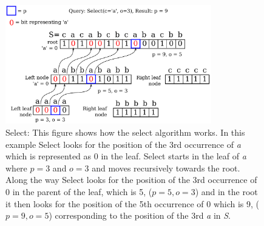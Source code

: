 \begin{figure}
\center \includegraphics[width=0.8\textwidth]{SelectDrawing}
\caption{Select: This figure shows how the select algorithm works. 
In this example Select looks for the position of the 3rd occurrence of \textit{a} which is represented as 0 in the leaf.
Select starts in the leaf of \textit{a} where $p = 3$ and $o = 3$ and moves recursively towards the root. Along the way Select looks for the position of the 3rd occurrence of 0 in the parent of the leaf, which is 5, ($p=5, o=3$) and in the root it then looks for the position of the 5th occurrence of 0 which is 9, ($p=9, o=5$)  corresponding to the position of the 3rd \textit{a} in \textit{S}.}
\label{fig:SelectDrawing}
\end{figure}

